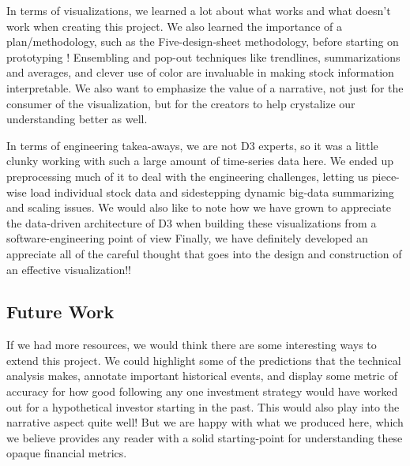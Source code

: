 \documentclass{vgtc}                          %
\begin{document}
In terms of visualizations, we learned a lot about what works and what doesn't work when creating this project. We also learned the importance of a plan/methodology, such as the Five-design-sheet methodology, before starting on prototyping \cite{FDS}! Ensembling and pop-out techniques like trendlines, summarizations and averages, and clever use of color are invaluable in making stock information interpretable. We also want to emphasize the value of a narrative, not just for the consumer of the visualization, but for the creators to help crystalize our understanding better as well.

In terms of engineering takea-aways, we are not D3 experts, so it was a little clunky working with such a large amount of time-series data here. We ended up preprocessing much of it to deal with the engineering challenges, letting us piece-wise load individual stock data and sidestepping dynamic big-data summarizing and scaling issues.  We would also like to note how we have grown to appreciate the data-driven architecture of D3 when building these visualizations from a software-engineering point of view Finally, we have definitely developed an appreciate all of the careful thought that goes into the design and construction of an effective visualization!!

\subsection{Future Work}
If we had more resources, we would think there are some interesting ways to extend this project. We could highlight some of the predictions that the technical analysis makes, annotate important historical events, and display some metric of accuracy for how good following any one investment strategy would have worked out for a hypothetical investor starting in the past. This would also play into the narrative aspect quite well! But we are happy with what we produced here, which we believe provides any reader with a solid starting-point for understanding these opaque financial metrics.



%

%
%
%


\end{document}

